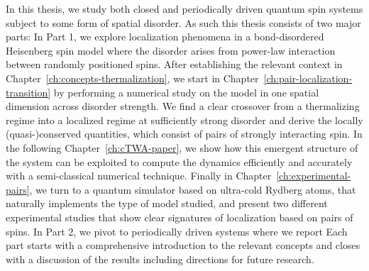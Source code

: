 In this thesis, we study both closed and periodically driven quantum spin systems subject to some form of spatial disorder. As such this thesis consists of two major parts: 
In Part 1, we explore localization phenomena in a bond-disordered Heisenberg spin model where the disorder arises from power-law interaction between randomly positioned spins. After establishing the relevant context in Chapter~\ref{ch:concepts-thermalization}, we start in Chapter~\ref{ch:pair-localization-transition} by performing a numerical study on the model in one spatial dimension across disorder strength. We find a clear crossover from a thermalizing regime into a localized regime at sufficiently strong disorder and derive the locally (quasi-)conserved quantities, which consist of pairs of strongly interacting spin. In the following Chapter~\ref{ch:cTWA-paper}, we show how this emergent structure of the system can be exploited to compute the dynamics efficiently and accurately with a semi-classical numerical technique. Finally in Chapter~\ref{ch:experimental-pairs}, we turn to a quantum simulator based on ultra-cold Rydberg atoms, that naturally implements the type of model studied, and present two different experimental studies that show clear signatures of localization based on pairs of spins.
In Part 2, we pivot to periodically driven systems where we report 
Each part starts with a comprehensive introduction to the relevant concepts and closes with a discussion of the results including directions for future research.



